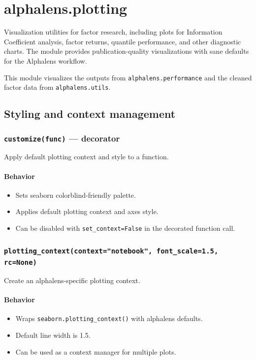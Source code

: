 \documentclass[11pt]{article}
\begin{document}
\section{alphalens.plotting}

Visualization utilities for factor research, including plots for Information Coefficient analysis, factor returns, quantile performance, and other diagnostic charts. The module provides publication-quality visualizations with sane defaults for the Alphalens workflow.

This module visualizes the outputs from \texttt{alphalens.performance} and the cleaned factor data from \texttt{alphalens.utils}.

\subsection{Styling and context management}

\subsubsection{\texttt{customize(func)} --- decorator}
Apply default plotting context and style to a function.

\paragraph{Behavior}
\begin{itemize}
  \item Sets seaborn colorblind-friendly palette.
  \item Applies default plotting context and axes style.
  \item Can be disabled with \texttt{set\_context=False} in the decorated function call.
\end{itemize}

\subsubsection{\texttt{plotting\_context(context="notebook", font\_scale=1.5, rc=None)}}
Create an alphalens-specific plotting context.

\paragraph{Behavior}
\begin{itemize}
  \item Wraps \texttt{seaborn.plotting\_context()} with alphalens defaults.
  \item Default line width is 1.5.
  \item Can be used as a context manager for multiple plots.
\end{itemize}
\end{document}
